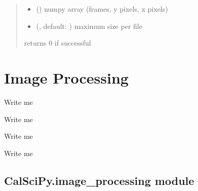 \documentclass[letterpaper,10pt,english]{sphinxmanual}
\begin{document}
\begin{fulllineitems}
\begin{quote}
\begin{description}
\begin{itemize}
\item {} 
\sphinxAtStartPar
{} () \textendash{} numpy array (frames, y pixels, x pixels)

\item {} 
\sphinxAtStartPar
{} (, default: ) \textendash{} maximum size per file

\end{itemize}

\sphinxAtStartPar
{}

\sphinxAtStartPar
returns 0 if successful

\end{description}\end{quote}

\end{fulllineitems}



\section{Image Processing}
\label{\detokenize{Sub-Packages:image-processing}}\label{\detokenize{Sub-Packages:image-processing-module}}
\begin{DUlineblock}{0em}
\item[] Write me
\item[] Write me
\item[] Write me
\item[] Write me
\end{DUlineblock}

\sphinxstepscope


\subsection{CalSciPy.image\_processing module}
\label{\detokenize{CalSciPy.image_processing:module-CalSciPy.image_processing}}\label{\detokenize{CalSciPy.image_processing:calscipy-image-processing-module}}\label{\detokenize{CalSciPy.image_processing::doc}}
\end{document}
